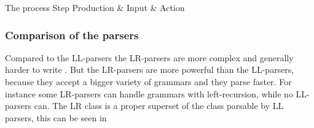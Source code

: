 	      {The process}
{Step  	 }{Production & Input       & Action                     }{
}

\subsubsection{Comparison of the parsers}
Compared to the LL-parsers the LR-parsers are more complex and generally harder to write \cite[pp. 193]{sebesta2013}. But the LR-parsers are more powerful than the LL-parsers, because they accept a bigger variety of grammars and they parse faster. For instance some LR-parsers can handle grammars with left-recursion, while no LL-parsers can. The LR class is a proper superset of the class parsable by LL parsers, this can be seen in 

